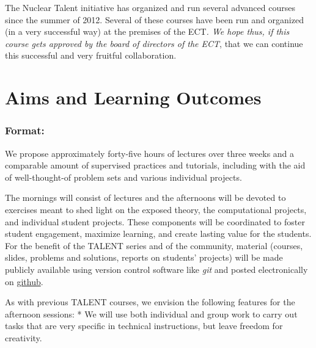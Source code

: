\documentclass[twocolumn,superscriptaddress,amsmath,amssymb,aps,floatfix]{revtex4-2}
\begin{document}
The Nuclear Talent initiative has organized and run several advanced
courses since the summer of 2012. Several of these courses have been run
and organized (in a very successful way) at the premises of the
ECT\emph{. We hope thus, if this course gets approved by the board of
directors of the ECT}, that we can continue this successful and very
fruitful collaboration.

    \section{Aims and Learning
Outcomes}\label{aims-and-learning-outcomes}

    \subsubsection{Format:}\label{format}

We propose approximately forty-five hours of lectures over three weeks
and a comparable amount of 
supervised practices and tutorials,
including 
with the aid of well-thought-of problem sets and 
various individual projects.

The mornings will consist of lectures and the afternoons will be devoted
to exercises meant to shed light on the exposed theory, the
computational projects, and individual student projects. These components
will be coordinated to foster student engagement, maximize learning, and
create lasting value for the students. For the benefit of the TALENT
series and of the community, material (courses, slides, problems and
solutions, reports on students' projects) will be made publicly
available using version control software like \emph{git} and posted
electronically on \href{https://github.com}{github}.

As with previous TALENT courses, we envision the following features for
the afternoon sessions: * We will use both individual and group work to
carry out tasks that are very specific in technical instructions, but
leave freedom for creativity.
\end{document}
